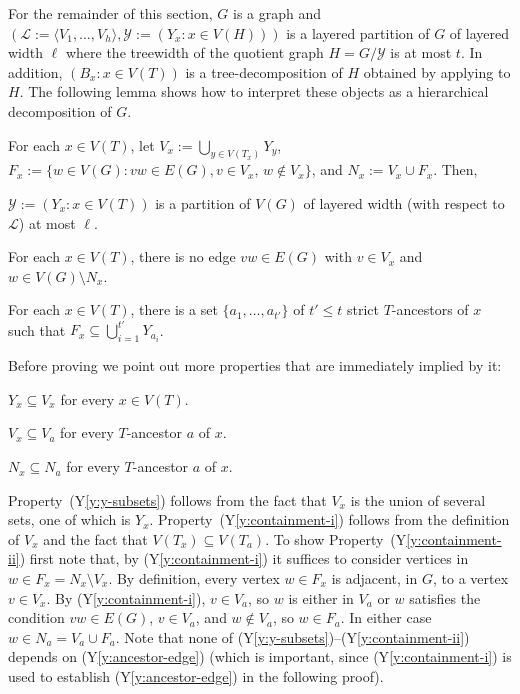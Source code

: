 \documentclass{patmorin}
\newcommand{\ylabel}[1]{\label{y:#1}}
\newcommand{\yref}[1]{(Y\ref{y:#1})}
\renewcommand{\le}{\leqslant}
\begin{document}

For the remainder of this section, $G$ is a graph and $(\mathcal{L}:=\langle V_1,\ldots,V_h\rangle,\mathcal{Y}:=(Y_x: x\in V(H)))$ is a layered partition of $G$ of layered width $\ell$ where the treewidth of the quotient graph $H=G/\mathcal{Y}$ is at most $t$.  In addition, $(B_x:x\in V(T))$ is a tree-decomposition of $H$ obtained by applying  to $H$.  The following lemma shows how to interpret these objects as a hierarchical decomposition of $G$.

\begin{clm}
  For each $x\in V(T)$, let $V_x := \bigcup_{y\in V(T_x)} Y_y$, $F_x:=\{w\in V(G): vw\in E(G), v\in V_x,\, w\not\in V_x\}$, and $N_x:=V_x\cup F_x$.  Then, 
  \begin{compactenum}[(Y1)]
    \item\ylabel{thickness} $\mathcal{Y}:=(Y_x: x\in V(T))$ is a partition of $V(G)$ of layered width (with respect to $\mathcal{L}$) at most $\ell$.
    \item\ylabel{separator} For each $x\in V(T)$, there is no edge $vw\in E(G)$ with $v\in V_x$ and $w\in V(G)\setminus N_x$. 
    \item\ylabel{ancestor-edge} For each $x\in V(T)$, there is a set $\{a_1,\ldots,a_{t'}\}$ of $t'\le t$ strict $T$-ancestors of $x$ such that $F_x \subseteq \bigcup_{i=1}^{t'} Y_{a_i}$.
  \end{compactenum}
\end{clm}

Before proving  we point out more properties that are immediately implied by it:

\begin{compactenum}[(Y1)]\setcounter{enumi}{3}
  \item\ylabel{y-subsets} $Y_x\subseteq V_x$ for every $x\in V(T)$. 
  \item\ylabel{containment-i} $V_x\subseteq V_a$ for every $T$-ancestor $a$ of $x$. 
  \item\ylabel{containment-ii}$N_x\subseteq N_a$ for every $T$-ancestor $a$ of $x$.
\end{compactenum}

Property~\yref{y-subsets} follows from the fact that $V_x$ is the union of several sets, one of which is $Y_x$.  Property~\yref{containment-i} follows from the definition of $V_x$ and the fact that $V(T_x)\subseteq V(T_a)$. To show Property~\yref{containment-ii} first note that, by \yref{containment-i} it suffices to consider vertices in $w\in F_x=N_x\setminus V_x$. By definition, every vertex $w\in F_x$ is adjacent, in $G$, to a vertex $v\in V_x$.  By \yref{containment-i}, $v\in V_a$, so $w$ is either in $V_a$ or $w$ satisfies the condition $vw\in E(G)$, $v\in V_a$, and $w\not\in V_a$, so $w\in F_a$.  In either case $w\in N_a=V_a\cup F_a$.  Note that none of \yref{y-subsets}--\yref{containment-ii} depends on \yref{ancestor-edge} (which is important, since \yref{containment-i} is used to establish \yref{ancestor-edge} in the following proof).
\end{document}
